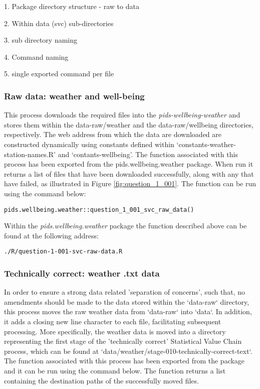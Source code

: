 \documentclass[12pt, oneside, openany]{book}
\begin{document}
1. Package directory structure - raw to data

2. Within data (svc) sub-directories

3. sub directory naming

4. Command naming

5. single exported command per file

\subsubsection*{Raw data: weather and well-being}

This process downloads the required files into the \emph{pids-wellbeing-weather} and stores them within the data-raw/weather and the data-raw/wellbeing directories, respectively. The web address from which the data are downloaded are constructed dynamically using constants defined within `constants-weather-station-names.R' and `contants-wellbeing'. The function associated with this process has been exported from the pids.wellbeing.weather package. When run it returns a list of files that have been downloaded successfully, along with any that have failed, as illustrated in Figure \ref{fig:question_1_001}. The function can be run using the command below:

\begin{verbatim}
pids.wellbeing.weather::question_1_001_svc_raw_data()
\end{verbatim}

Within the \emph{pids.wellbeing.weather} package the function described above can be found at the following address:

\begin{verbatim}
./R/question-1-001-svc-raw-data.R
\end{verbatim}

\subsubsection*{Technically correct: weather .txt data}

In order to ensure a strong data related 'separation of concerns', such that, no amendments should be made to the data stored within the `data-raw` directory, this process moves the raw weather data from `data-raw` into `data`. In addition, it adds a closing new line character to each file, facilitating subsequent processing. More specifically, the weather data is moved into a directory representing the first stage of the 'technically correct' Statistical Value Chain process, which can be found at `data/weather/stage-010-technically-correct-text`. The function associated with this process has been exported from the package and it can be run using the command below. The function returns a list containing the destination paths of the successfully moved files.
\end{document}
